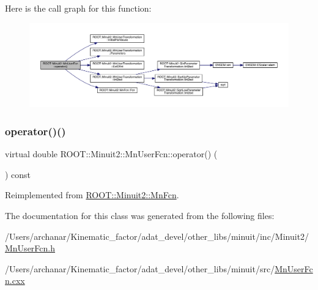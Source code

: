 Here is the call graph for this function\+:\nopagebreak
\begin{figure}[H]
\begin{center}
\leavevmode
\includegraphics[width=350pt]{d6/ded/classROOT_1_1Minuit2_1_1MnUserFcn_a7f25ae05f1caca57bd8d1e83b9643dfe_cgraph}
\end{center}
\end{figure}
\mbox{\label{classROOT_1_1Minuit2_1_1MnUserFcn_aad007634c740a70ebb8f5acb0a7cfede}} 
\subsubsection{\texorpdfstring{operator()()}{operator()()}\hspace{0.1cm}{\footnotesize\ttfamily [2/2]}}
{\footnotesize\ttfamily virtual double R\+O\+O\+T\+::\+Minuit2\+::\+Mn\+User\+Fcn\+::operator() (\begin{DoxyParamCaption}\item[{const \mbox{\hyperlink{namespaceROOT_1_1Minuit2_a62ed97730a1ca8d3fbaec64a19aa11c9}{Mn\+Algebraic\+Vector}} \&}]{ }\end{DoxyParamCaption}) const\hspace{0.3cm}{\ttfamily [virtual]}}



Reimplemented from \mbox{\hyperlink{classROOT_1_1Minuit2_1_1MnFcn_a61a5f3cd53f1d7daa96bae19f4b1dbb6}{R\+O\+O\+T\+::\+Minuit2\+::\+Mn\+Fcn}}.



The documentation for this class was generated from the following files\+:\begin{DoxyCompactItemize}
\item 
/\+Users/archanar/\+Kinematic\+\_\+factor/adat\+\_\+devel/other\+\_\+libs/minuit/inc/\+Minuit2/\mbox{\hyperlink{other__libs_2minuit_2inc_2Minuit2_2MnUserFcn_8h}{Mn\+User\+Fcn.\+h}}\item 
/\+Users/archanar/\+Kinematic\+\_\+factor/adat\+\_\+devel/other\+\_\+libs/minuit/src/\mbox{\hyperlink{MnUserFcn_8cxx}{Mn\+User\+Fcn.\+cxx}}\end{DoxyCompactItemize}
